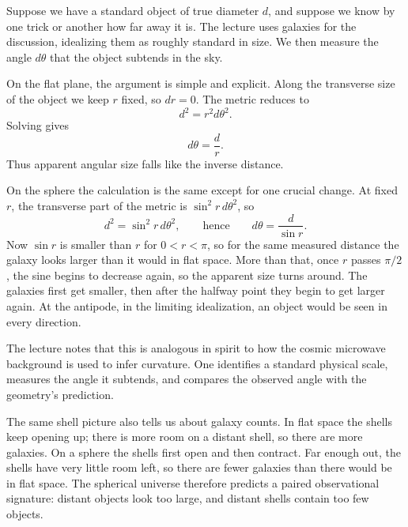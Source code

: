 Suppose we have a standard object of true diameter \(d\), and suppose we know by one trick or another how far away it is. The lecture uses galaxies for the discussion, idealizing them as roughly standard in size. We then measure the angle \(d\theta\) that the object subtends in the sky.

On the flat plane, the argument is simple and explicit. Along the transverse size of the object we keep \(r\) fixed, so \(dr=0\). The metric reduces to
\begin{equation}
d^2 = r^2 d\theta^2.
\end{equation}
Solving gives
\begin{equation}
d\theta = \frac{d}{r}.
\end{equation}
Thus apparent angular size falls like the inverse distance.

On the sphere the calculation is the same except for one crucial change. At fixed \(r\), the transverse part of the metric is \(\sin^2 r\, d\theta^2\), so
\begin{equation}
d^2 = \sin^2 r\, d\theta^2,
\qquad\text{hence}\qquad
d\theta = \frac{d}{\sin r}.
\end{equation}
Now \(\sin r\) is smaller than \(r\) for \(0<r<\pi\), so for the same measured distance the galaxy looks larger than it would in flat space. More than that, once \(r\) passes \(\pi/2\), the sine begins to decrease again, so the apparent size turns around. The galaxies first get smaller, then after the halfway point they begin to get larger again. At the antipode, in the limiting idealization, an object would be seen in every direction.

The lecture notes that this is analogous in spirit to how the cosmic microwave background is used to infer curvature. One identifies a standard physical scale, measures the angle it subtends, and compares the observed angle with the geometry's prediction.

The same shell picture also tells us about galaxy counts. In flat space the shells keep opening up; there is more room on a distant shell, so there are more galaxies. On a sphere the shells first open and then contract. Far enough out, the shells have very little room left, so there are fewer galaxies than there would be in flat space. The spherical universe therefore predicts a paired observational signature: distant objects look too large, and distant shells contain too few objects.

